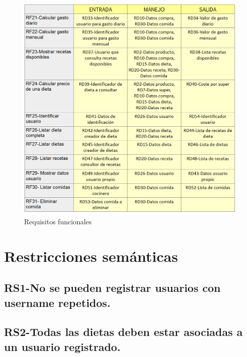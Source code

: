 \documentclass[a4paper,12pt]{report}
\begin{document}
\begin{figure}[!htp]
\centering
\includegraphics[width=0.9\linewidth]{./refinamientos/tablaRF2.png}
\caption{Requisitos funcionales}
\label{fig:Requisitos funcionales}
\medskip
\footnotesize
{}
\end{figure}

\section{Restricciones semánticas}
\label{sec-2-3}
\subsection{RS1-No se pueden registrar usuarios con username repetidos.}
\label{sec-2-3-1}
\subsection{RS2-Todas las dietas deben estar asociadas a un usuario registrado.}
\label{sec-2-3-2}
\end{document}
